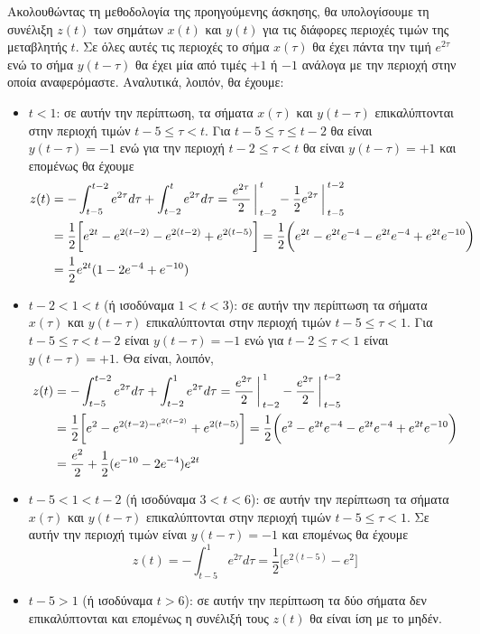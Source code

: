 \documentclass[a4paper,twoside,10pt,openany]{memoir}
\theoremstyle{dotless}
\begin{document}
\begin{solution}
Ακολουθώντας τη μεθοδολογία της προηγούμενης άσκησης, θα υπολογίσουμε τη συνέλιξη $z(t)$ των σημάτων $x(t)$ και $y(t)$ για τις διάφορες περιοχές τιμών της μεταβλητής $t$. Σε όλες αυτές τις περιοχές το σήμα $x(\tau)$ θα έχει πάντα την τιμή $e^{2\tau}$ ενώ το σήμα $y(t-\tau)$ θα έχει μία από τιμές $+1$ ή $-1$ ανάλογα με την περιοχή στην οποία αναφερόμαστε. Αναλυτικά, λοιπόν, θα έχουμε:
\begin{itemize}
\setlength{\itemsep}{-1.2pt}
\item $t<1$: σε αυτήν την περίπτωση, τα σήματα $x(\tau)$ και $y(t-\tau)$ επικαλύπτονται στην περιοχή τιμών $t-5\leq\tau<t$. Για $t-5\leq\tau\leq t-2$ θα είναι $y(t-\tau)=-1$ ενώ για την περιοχή $t-2\leq\tau<t$ θα είναι $y(t-\tau)=+1$ και επομένως θα έχουμε
\begin{align*}
z(t)&=-\int_{t-5}^{t-2}e^{2\tau}d\tau+\int_{t-2}^{t}
e^{2\tau}d\tau=\frac{e^{2\tau}}{2}\bigg\arrowvert_{t-2}^{t}-
\frac{1}{2}e^{2\tau}\bigg\arrowvert_{t-5}^{t-2}\\&=\frac{1}{2}\bigg[e^{2t}-e^{2(t-2)}-e^{2(t-2)}+e^{2(t-5)}\bigg]=
\frac{1}{2}\bigg(e^{2t}-e^{2t}e^{-4}-e^{2t}e^{-4}+e^{2t}e^{-10}\bigg)\\
&=\frac{1}{2}e^{2t}(1-2e^{-4}+e^{-10})
\end{align*}
\item $t-2<1<t$ (ή ισοδύναμα $1<t<3$): σε αυτήν την περίπτωση τα σήματα $x(\tau)$ και $y(t-\tau)$ επικαλύπτονται στην περιοχή τιμών $t-5\leq\tau<1$. Για $t-5\leq\tau<t-2$ είναι $y(t-\tau)=-1$ ενώ για $t-2\leq\tau<1$ είναι $y(t-\tau)=+1$. Θα είναι, λοιπόν,
\begin{align*}
z(t)&=-\int_{t-5}^{t-2}e^{2\tau}d\tau+\int_{t-2}^{1}e^{2\tau}d\tau=
\frac{e^{2\tau}}{2}\bigg\arrowvert_{t-2}^{1}-\frac{e^{2\tau}}{2}
\bigg\arrowvert_{t-5}^{t-2}\\&=\frac{1}{2}\bigg[e^2-e^{2(t-2)-e^{2(t-2)}}+
e^{2(t-5)}\bigg]=\frac{1}{2}\bigg(e^2-e^{2t}e^{-4}-e^{2t}e^{-4}+e^{2t}e^{-10}\bigg)\\
&=\frac{e^2}{2}+\frac{1}{2}(e^{-10}-2e^{-4})e^{2t}
\end{align*}
\item $t-5<1<t-2$ (ή ισοδύναμα $3<t<6$): σε αυτήν την περίπτωση τα σήματα $x(\tau)$ και $y(t-\tau)$ επικαλύπτονται στην περιοχή τιμών $t-5\leq\tau<1$. Σε αυτήν την περιοχή τιμών είναι $y(t-\tau)=-1$ και επομένως θα έχουμε
\begin{equation*}
z(t)=-\int_{t-5}^{1}e^{2\tau}d\tau=\frac{1}{2}\bigg[e^{2(t-5)}-e^2\bigg]
\end{equation*}
\item $t-5>1$ (ή ισοδύναμα $t>6$): σε αυτήν την περίπτωση τα δύο σήματα δεν επικαλύπτονται και επομένως η συνέλιξή τους $z(t)$ θα είναι ίση με το μηδέν.

\end{itemize}
\end{solution}
\end{document}
